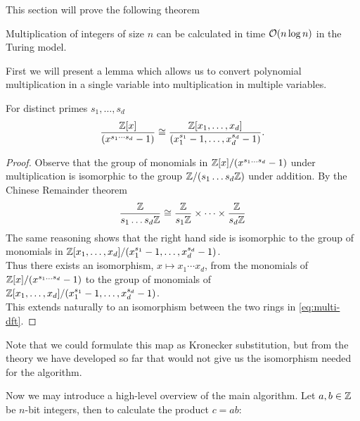 This section will prove the following theorem

\begin{theorem}\label{thm:main-theorem}
    \smallskip

    Multiplication of integers of size $n$ can be calculated in time $\mathcal O(n \log n)$ in the Turing model.
\end{theorem}

First we will present a lemma which allows us to convert polynomial multiplication in a single variable into multiplication in multiple variables.

\begin{lemma}\label{eq:uni-to-multi}
    For distinct primes $s_1, \ldots, s_d$
    \begin{equation}\label{eq:multi-dft}
        \frac{{\mathbb Z}[x]}{(x^{s_1\cdots s_d} - 1)} \cong \frac{{\mathbb Z}[x_1, \ldots, x_d]}{(x_1^{s_1} - 1, \ldots, x_d^{s_d} - 1)}.
    \end{equation}
\end{lemma}

\begin{proof}
    Observe that the group of monomials in ${\mathbb Z}[x]/(x^{s_1\ldots s_d} - 1)$ under multiplication is isomorphic to the group ${\mathbb Z}/(s_1 \ldots s_d{\mathbb Z})$ under addition. By the Chinese Remainder theorem
    \[
        \frac{{\mathbb Z}}{s_1\ldots s_d {\mathbb Z}} \cong \frac{{\mathbb Z}}{s_1 {\mathbb Z}} \times \cdots \times \frac{{\mathbb Z}}{s_d {\mathbb Z}}
    \]
    The same reasoning shows that the right hand side is isomorphic to the group of monomials in ${\mathbb Z}[x_1, \ldots, x_d]/(x_1^{s_1} - 1, \ldots, x_d^{s_d} - 1)$.\\
    Thus there exists an isomorphism, $x \mapsto x_1\cdots x_d$, from the monomials of ${\mathbb Z}[x]/(x^{s_1\ldots s_d} - 1)$ to the group of monomials of ${\mathbb Z}[x_1, \ldots, x_d]/(x_1^{s_1} - 1, \ldots, x_d^{s_d} - 1)$.\\
    This extends naturally to an isomorphism between the two rings in \eqref{eq:multi-dft}.
\end{proof}

Note that we could formulate this map as Kronecker substitution, but from the theory we have developed so far that would not give us the isomorphism needed for the algorithm.

Now we may introduce a high-level overview of the main algorithm. Let $a, b \in {\mathbb Z}$ be $n$-bit integers, then to calculate the product $c = ab$:

